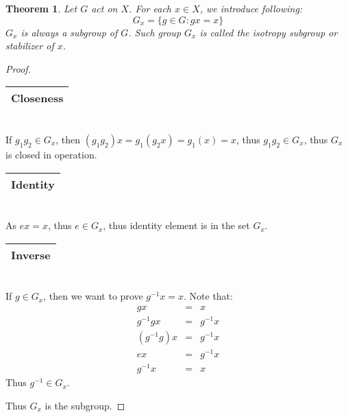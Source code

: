 \documentclass{article}
\theoremstyle{MyNonumberplain}
\theoremstyle{break}
\newtheorem*{proof}{Proof. }
\theoremstyle{break}
\newtheorem{theorem}{Theorem}[section]
\theoremstyle{break}
\theoremstyle{definition}
\theoremstyle{break}
\begin{document}
\begin{thmbox}
    \begin{theorem}
        Let $G$ act on $X$. For each $x \in X$, we introduce following:
        \[ G_x = \{ g \in G : g x = x \} \]
        $G_x$ is always a subgroup of $G$. Such group $G_x$ is called the isotropy
        subgroup or stabilizer of $x$.
    \end{theorem}
    \begin{prfbox}
        \begin{proof}
            \begin{tabular}{|c|}
                \hline
                Closeness\\
                \hline
              \end{tabular}\\
              
              If $g_1 g_2 \in G_x$, then $(g_1 g_2) x = g_1 (g_2 x) = g_1 (x) = x$, thus
              $g_1 g_2 \in G_x$, thus $G_x$ is closed in operation.\bigskip
              
              \begin{tabular}{|c|}
                \hline
                Identity\\
                \hline
              \end{tabular}\\
              
              As $e x = x$, thus $e \in G_x$, thus identity element is in the set $G_x$.\bigskip
              
              \begin{tabular}{|c|}
                \hline
                Inverse\\
                \hline
              \end{tabular}\\
              
              If $g \in G_x$, then we want to prove $g^{- 1} x = x$. Note that:
              \begin{eqnarray*}
                g x & = & x\\
                g^{- 1} g x & = & g^{- 1} x\\
                (g^{- 1} g) x & = & g^{- 1} x\\
                e x & = & g^{- 1} x\\
                g^{- 1} x & = & x
              \end{eqnarray*}
              Thus $g^{- 1} \in G_x$.\bigskip
              
              Thus $G_x$ is the subgroup.
        \end{proof}
    \end{prfbox}
\end{thmbox}
\end{document}
